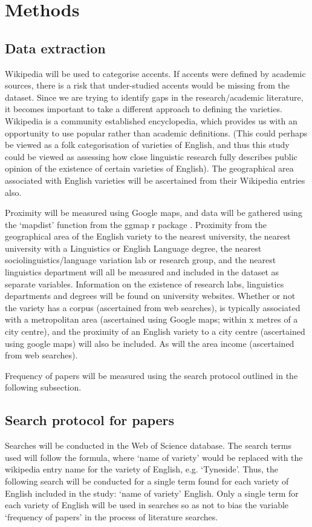 \documentclass[review]{article}
\begin{document}
	
\section{Methods}




\subsection{Data extraction}
Wikipedia will be used to categorise accents. If accents were defined by academic sources, there is a risk that under-studied accents would be missing from the dataset. Since we are trying to identify gaps in the research/academic literature, it becomes important to take a different approach to defining the varieties. Wikipedia is a community established encyclopedia, which provides us with an opportunity to use popular rather than academic definitions. (This could perhaps be viewed as a folk categorisation of varieties of English, and thus this study could be viewed as assessing how close linguistic research fully describes public opinion of the existence of certain varieties of English). The geographical area associated with English varieties will be ascertained from their Wikipedia entries also.

Proximity will be measured using Google maps, and data will be gathered using the `mapdist' function from the ggmap r package \cite{kahle2013ggmap,R2018}. Proximity from the geographical area of the English variety to the nearest university, the nearest university with a Linguistics or English Language degree, the nearest sociolinguistics/language variation lab or research group, and the nearest linguistics department will all be measured and included in the dataset as separate variables. Information on the existence of research labs, linguistics departments and degrees will be found on university websites. Whether or not the variety has a corpus (ascertained from web searches), is typically associated with a metropolitan area (ascertained using Google maps; within x metres of a city centre), and the proximity of an English variety to a city centre (ascertained using google maps) will also be included. As will the area income (ascertained from web searches).

Frequency of papers will be measured using the search protocol outlined in the following subsection. 

\subsection{Search protocol for papers}
Searches will be conducted in the Web of Science database. The search terms used will follow the formula, where `name of variety' would be replaced with the wikipedia entry name for the variety of English, e.g. `Tyneside'. Thus, the following search will be conducted for a single term found for each variety of English included in the study: `name of variety' English. Only a single term for each variety of English will be used in searches so as not to bias the variable `frequency of papers' in the process of literature searches.
\end{document}
